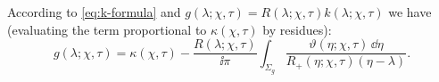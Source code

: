 According to \eqref{eq:k-formula} and $g(\lambda;\chi,\tau)=R(\lambda;\chi,\tau)k(\lambda;\chi,\tau)$ we have (evaluating the term proportional to $\kappa(\chi,\tau)$ by residues):
\begin{equation}
g(\lambda;\chi,\tau)= \kappa(\chi,\tau)-\frac{R(\lambda;\chi,\tau)}{\ii\pi}\int_{\Sigma_g}\frac{\vartheta(\eta;\chi,\tau)\,\dd\eta}{R_+(\eta;\chi,\tau)(\eta-\lambda)}.
\end{equation}

